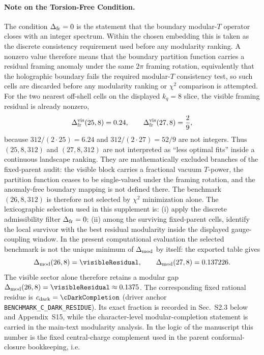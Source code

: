 \documentclass[11pt]{article}
\begin{document}
\paragraph*{Note on the Torsion-Free Condition.}
The condition $\Delta_{\rm fr}=0$ is the statement that the boundary
modular-$T$ operator closes with an integer spectrum. Within the chosen
embedding this is taken as the discrete consistency requirement used before any
modularity ranking. A nonzero value therefore means that the boundary
partition function carries a residual framing anomaly under the same $2\pi$
framing rotation, equivalently that the holographic boundary fails the required
modular-$T$ consistency test, so such cells are discarded before any modularity
ranking or $\chi^2$ comparison is attempted.
For the two nearest off-shell cells on the displayed $k_q=8$ slice, the
visible framing residual is already nonzero,
\begin{equation}
 \Delta_{\rm fr}^{\rm vis}(25,8)=0.24,
 \qquad
 \Delta_{\rm fr}^{\rm vis}(27,8)=\frac{2}{9},
\end{equation}
because $312/(2\cdot25)=6.24$ and $312/(2\cdot27)=52/9$ are not integers.
Thus $(25,8,312)$ and $(27,8,312)$ are not interpreted as ``less optimal
fits'' inside a continuous landscape ranking. They are mathematically excluded
branches of the fixed-parent audit: the visible block carries a fractional
vacuum $T$-power, the partition function ceases to be single-valued under the
framing rotation, and the anomaly-free boundary mapping is not defined there.
The benchmark $(26,8,312)$ is therefore not selected by $\chi^2$ minimization alone. The lexicographic selection used in this supplement is: (i) apply the discrete admissibility filter $\Delta_{\rm fr}=0$; (ii) among the surviving fixed-parent cells, identify the local survivor with the best residual modularity inside the displayed gauge-coupling window. %
In the present computational evaluation the selected benchmark is not the unique minimum of $\Delta_{\rm mod}$ by itself: the exported table gives
\begin{equation}
 \Delta_{\rm mod}(26,8)=\visibleResidual,
 \qquad
 \Delta_{\rm mod}(27,8)=0.137226.
\end{equation}
The visible sector alone therefore retains a modular gap $\Delta_{\rm mod}(26,8)=\visibleResidual\approx0.1375$. The corresponding fixed rational residue is $c_{\rm dark}=\cDarkCompletion$ (driver anchor \texttt{BENCHMARK\_C\_DARK\_RESIDUE}). Its exact fraction is recorded in Sec.~S2.3 below and Appendix~S15, while the character-level modular-completion statement is carried in the main-text modularity analysis. In the logic of the manuscript this number is the fixed central-charge complement used in the parent conformal-closure bookkeeping, i.e.
\end{document}
